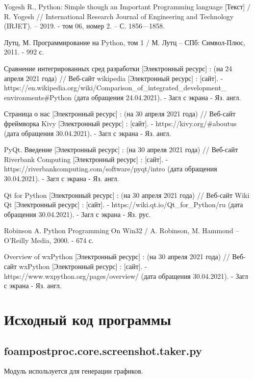 \documentclass[14pt]{extreport}
\begin{document}
\begin{thebibliography}{9}
Yogesh R., Python: Simple though an Important Programming language [Текст]  / R. Yogesh // International Research Journal of Engineering and Technology (IRJET). – 2019. - том 06, номер 2. – С. 1856—1858.

Лутц, М. Программирование на Python, том 1 / М. Лутц -- СПб: Символ-Плюс, 2011. - 992 с.

Сравнение интегрированных сред разработки [Электронный ресурс] : (на 24 апреля 2021 года) // Веб-сайт wikipedia [Электронный ресурс] : [сайт]. - https://en.wikipedia.org/wiki/Comparison\_of\_integrated\_development\_\\environments\#Python (дата обращения 24.04.2021). - Загл с экрана - Яз. англ.

Страница о нас [Электронный ресурс] : (на 30 апреля 2021 года) // Веб-сайт фреймворка Kivy [Электронный ресурс] : [сайт]. - https://kivy.org/\#aboutus (дата обращения 30.04.2021). - Загл с экрана - Яз. англ.

PyQt. Введение [Электронный ресурс] : (на 30 апреля 2021 года) // Веб-сайт Riverbank Computing [Электронный ресурс] : [сайт]. - https://riverbankcomputing.com/software/pyqt/intro (дата обращения 30.04.2021). - Загл с экрана - Яз. англ.

Qt for Python [Электронный ресурс] : (на 30 апреля 2021 года) // Веб-сайт Wiki Qt [Электронный ресурс] : [сайт]. - https://wiki.qt.io/Qt\_for\_Python/ru (дата обращения 30.04.2021). - Загл с экрана - Яз. рус.

Robinson A. Python Programming On Win32 / A. Robinson, M. Hammond -- O'Reilly Media, 2000. - 674 с.

Overview of wxPython [Электронный ресурс] : (на 30 апреля 2021 года) // Веб-сайт wxPython [Электронный ресурс] : [сайт]. - https://www.wxpython.org/pages/overview/ (дата обращения 30.04.2021). - Загл с экрана - Яз. англ.

\end{thebibliography}


\Appendix
\chapter{Исходный код программы}
\section{foampostproc.core.screenshot.taker.py}
Модуль используется для генерации графиков.

\end{document}
